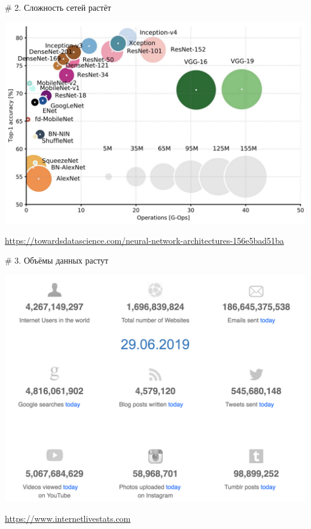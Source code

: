 \documentclass[notes,12pt, aspectratio=169]{beamer}
\newenvironment{wideitemize}{\itemize\addtolength{\itemsep}{10pt}}{\enditemize}
\begin{document}
\begin{frame}{\# 2. Сложность сетей растёт}
\begin{center}
	\includegraphics[width=.67\linewidth]{trend22.png}
\end{center}
\vfill %
\footnotesize
\color{blue} \url{https://towardsdatascience.com/neural-network-architectures-156e5bad51ba}
\end{frame} 


\begin{frame}{\# 3. Объёмы данных растут}
\begin{center}
	\includegraphics[width=.6\linewidth]{trend3.png}
\end{center}
\vfill %
\footnotesize
\color{blue} \url{https://www.internetlivestats.com}
\end{frame} 
\end{document}

